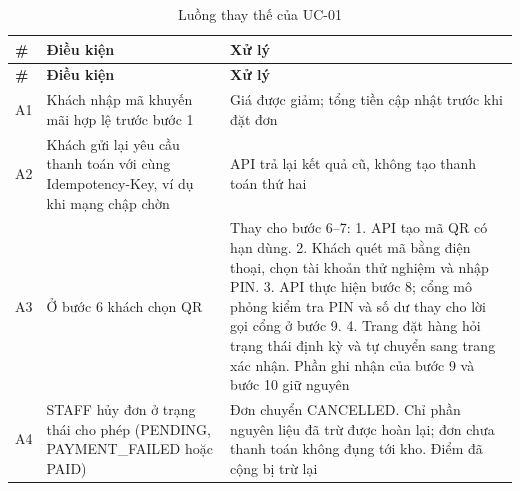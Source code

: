 {\small
\begin{longtable}{@{}L{0.9cm}L{4.4cm}L{8.6cm}@{}}
\caption{Luồng thay thế của UC-01}\label{tab:ucalt}\\
\toprule
\textbf{\#} & \textbf{Điều kiện} & \textbf{Xử lý} \\ \midrule \endfirsthead
\toprule \textbf{\#} & \textbf{Điều kiện} & \textbf{Xử lý} \\ \midrule \endhead
\bottomrule \endfoot
A1 & Khách nhập mã khuyến mãi hợp lệ trước bước 1 & Giá được giảm; tổng tiền cập nhật trước khi đặt đơn \\
A2 & Khách gửi lại yêu cầu thanh toán với cùng Idempotency-Key, ví dụ khi mạng chập chờn & API trả lại kết quả cũ, không tạo thanh toán thứ hai \\
A3 & Ở bước 6 khách chọn QR & Thay cho bước 6--7:  1. API tạo mã QR có hạn dùng.  2. Khách quét mã bằng điện thoại, chọn tài khoản thử nghiệm và nhập PIN.  3. API thực hiện bước 8; cổng mô phỏng kiểm tra PIN và số dư thay cho lời gọi cổng ở bước 9.  4. Trang đặt hàng hỏi trạng thái định kỳ và tự chuyển sang trang xác nhận.  Phần ghi nhận của bước 9 và bước 10 giữ nguyên \\
A4 & STAFF hủy đơn ở trạng thái cho phép (PENDING, PAYMENT\_FAILED hoặc PAID) & Đơn chuyển CANCELLED. Chỉ phần nguyên liệu đã trừ được hoàn lại; đơn chưa thanh toán không đụng tới kho. Điểm đã cộng bị trừ lại \\
\end{longtable}
}